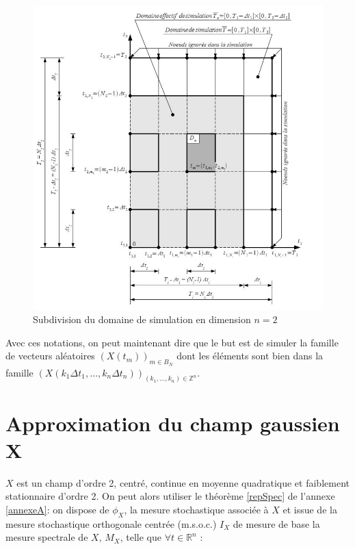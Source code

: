 \begin{figure}[h]
\begin{center}
\includegraphics[scale=1.0]{images/MethSpect-domaineTemporelDeSimulationDim2.jpg}
\caption{Subdivision du domaine de simulation en dimension $n=2$}
\label{subdivSDomaineTempsDim2}  
\end{center}
\end{figure}

Avec ces notations, on peut maintenant dire que le but est de simuler la famille de vecteurs aléatoires $(X(t_m))_{m \in B_N}$ dont les éléments sont bien dans la
famille $(X(k_1\Delta t_{1}, \dots, k_n\Delta t_{n}))_{(k_1, \dots, k_n) \in \mathbb{Z}^n}$.


\section{Approximation du champ gaussien X}
\label{approxchmX}
$X$ est un champ d'ordre 2, centré, continue en moyenne quadratique et faiblement stationnaire d'ordre 2. On peut alors utiliser le théorème \ref{repSpec} de l'annexe \ref{annexeA}: on dispose de $\phi_X$, la mesure stochastique associée
à $X$ et issue de la mesure stochastique orthogonale centrée (m.s.o.c.) $I_X$
de mesure de base la mesure spectrale de $X$, $M_X$, telle que $\forall t \in \mathbb{R}^{n}$ :

